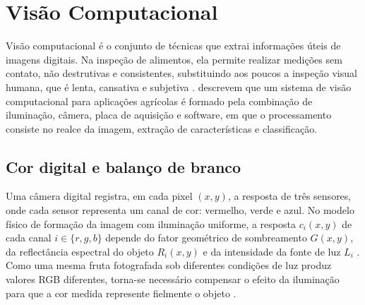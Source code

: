 \section{Visão Computacional}

Visão computacional é o conjunto de técnicas que extrai informações úteis de imagens digitais. Na inspeção de alimentos, ela permite realizar medições sem contato, não destrutivas e consistentes, substituindo aos poucos a inspeção visual humana, que é lenta, cansativa e subjetiva \cite{brosnan2004,cubero2011}. \textcite{chen2002} descrevem que um sistema de visão computacional para aplicações agrícolas é formado pela combinação de iluminação, câmera, placa de aquisição e software, em que o processamento consiste no realce da imagem, extração de características e classificação.

\subsection{Cor digital e balanço de branco}

Uma câmera digital registra, em cada pixel $(x,y)$, a resposta de três sensores, onde cada sensor representa um canal de cor: vermelho, verde e azul. No modelo físico de formação da imagem com iluminação uniforme, a resposta \(c_i(x,y)\) de cada canal \(i \in \{r, g, b\}\) depende do fator geométrico de sombreamento \(G(x,y)\), da reflectância espectral do objeto \(R_i(x,y)\) e da intensidade da fonte de luz \(L_{i}\) \cite{ebner2007}. Como uma mesma fruta fotografada sob diferentes condições de luz produz valores \acs{RGB} diferentes, torna-se necessário compensar o efeito da iluminação para que a cor medida represente fielmente o objeto \cite{ebner2007}.

